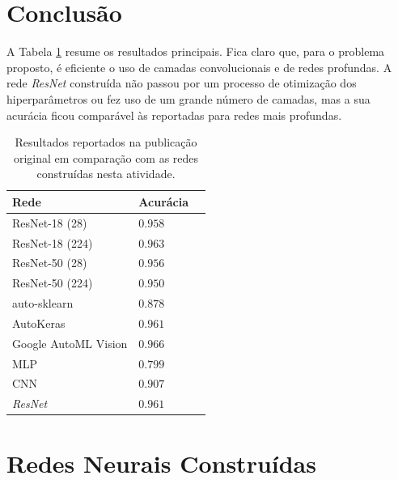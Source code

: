 \documentclass[final,5p]{elsarticle}
\numberwithin{equation}{section}
\begin{document}
    \section{Conclusão}

    A Tabela \ref{tab:resultados_resumo} resume os resultados principais. Fica claro que, para o problema proposto, é eficiente o uso de camadas convolucionais e de redes profundas. A rede \emph{ResNet} construída não passou por um processo de otimização dos hiperparâmetros ou fez uso de um grande número de camadas, mas a sua acurácia ficou comparável às reportadas para redes mais profundas.

    \begin{table}[h]
        \centering
        \begin{tabular}{l l c}
            \toprule
            \textbf{Rede} & \textbf{Acurácia} \\
            \midrule
            ResNet-18 (28) & $0.958$ \\
            ResNet-18 (224) & $0.963$ \\
            ResNet-50 (28) & $0.956$ \\
            ResNet-50 (224) & $0.950$ \\
            auto-sklearn & $0.878$ \\
            AutoKeras & $0.961$ \\
            Google AutoML Vision & $0.966$ \\
            \midrule
            MLP & $0.799$ \\
            CNN & $0.907$ \\
            \emph{ResNet} & $0.961$ \\
            \bottomrule
        \end{tabular}
        \caption{Resultados reportados na publicação original \cite{medmnistv2} em comparação com as redes construídas nesta atividade.}
        \label{tab:resultados_resumo}
    \end{table}

\appendix

    \section{Redes Neurais Construídas}
\end{document}
